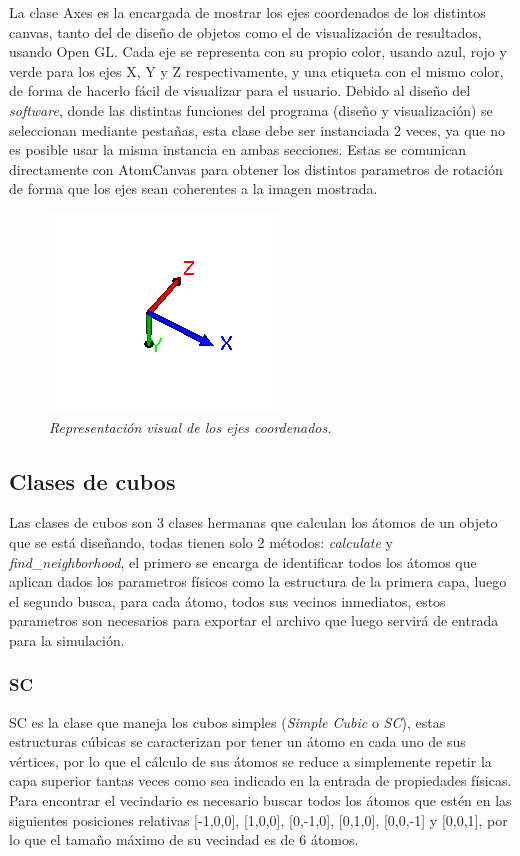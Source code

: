 La clase Axes es la encargada de mostrar los ejes coordenados de los distintos canvas, tanto del de diseño de objetos como el de visualización de resultados, usando Open GL.
Cada eje se representa con su propio color, usando azul, rojo y verde para los ejes X, Y y Z respectivamente, y una etiqueta con el mismo color, de forma de hacerlo fácil de visualizar para el usuario.
Debido al diseño del \emph{software}, donde las distintas funciones del programa (diseño y visualización) se seleccionan mediante pestañas, esta clase debe ser instanciada 2 veces, ya que no es posible usar la misma instancia en ambas secciones. Estas se comunican directamente con AtomCanvas para obtener los distintos parametros de rotación de forma que los ejes sean coherentes a la imagen mostrada.

\begin{figure}[H]
  \centering
  \includegraphics[scale=1]{images/axes}
  \caption{\em Representación visual de los ejes coordenados.}
\end{figure}

\subsection{Clases de cubos}

Las clases de cubos son 3 clases hermanas que calculan los átomos de un objeto que se está diseñando, todas tienen solo 2 métodos: \emph{calculate} y \emph{find\_neighborhood}, el primero se encarga de identificar todos los átomos que aplican dados los parametros físicos como la estructura de la primera capa, luego el segundo busca, para cada átomo, todos sus vecinos inmediatos, estos parametros son necesarios para exportar el archivo que luego servirá de entrada para la simulación.

\subsubsection{SC}
SC es la clase que maneja los cubos simples (\emph{Simple Cubic} o \emph{SC}), estas estructuras cúbicas se caracterizan por tener un átomo en cada uno de sus vértices, por lo que el cálculo de sus átomos se reduce a simplemente repetir la capa superior tantas veces como sea indicado en la entrada de propiedades físicas. Para encontrar el vecindario es necesario buscar todos los átomos que estén en las siguientes posiciones relativas [-1,0,0], [1,0,0], [0,-1,0], [0,1,0], [0,0,-1] y [0,0,1], por lo que el tamaño máximo de su vecindad es de 6 átomos.

